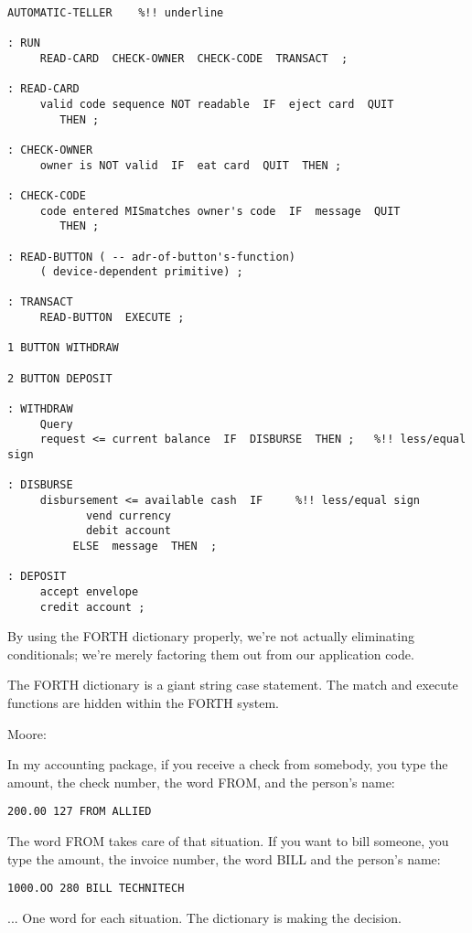 \begin{verbatim}
AUTOMATIC-TELLER	%!! underline

: RUN
     READ-CARD  CHECK-OWNER  CHECK-CODE  TRANSACT  ;

: READ-CARD
     valid code sequence NOT readable  IF  eject card  QUIT
        THEN ;

: CHECK-OWNER
     owner is NOT valid  IF  eat card  QUIT  THEN ;

: CHECK-CODE
     code entered MISmatches owner's code  IF  message  QUIT
        THEN ;

: READ-BUTTON ( -- adr-of-button's-function)
     ( device-dependent primitive) ;

: TRANSACT
     READ-BUTTON  EXECUTE ;

1 BUTTON WITHDRAW

2 BUTTON DEPOSIT

: WITHDRAW
     Query
     request <= current balance  IF  DISBURSE  THEN ;	%!! less/equal sign

: DISBURSE
     disbursement <= available cash  IF		%!! less/equal sign
            vend currency
            debit account
          ELSE  message  THEN  ;

: DEPOSIT
     accept envelope
     credit account ;
\end{verbatim}

By using the FORTH dictionary properly, we're not actually eliminating
conditionals; we're merely factoring them out from our application code.

The FORTH dictionary is a giant string case statement. The match and
execute functions are hidden within the FORTH system.

Moore:

In my accounting package, if you receive a check from somebody, you type
the amount, the check number, the word FROM, and the person's name:

\begin{verbatim}
200.00 127 FROM ALLIED
\end{verbatim}

The word FROM takes care of that situation. If you want to bill someone,
you type the amount, the invoice number, the word BILL and the person's
name:

\begin{verbatim}
1000.OO 280 BILL TECHNITECH
\end{verbatim}

... One word for each situation. The dictionary is making the decision.

